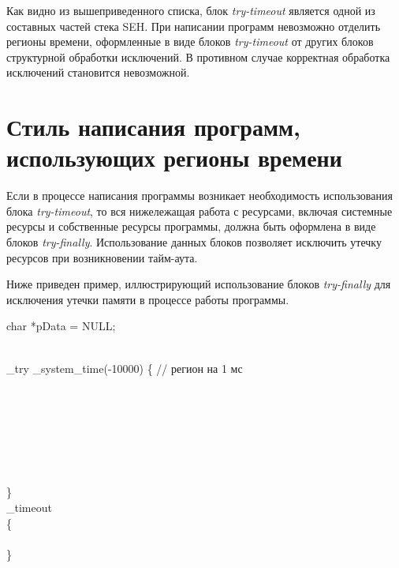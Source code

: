 \begin{multicols}{2}
   Как видно из вышеприведенного списка, блок \textit{try-timeout} является одной из составных частей
стека SEH. При написании программ невозможно отделить регионы времени, оформленные в виде
\mbox{блоков} \textit{try-timeout} от других блоков структурной обработки исключений. В противном случае
корректная обработка исключений становится невозможной.

\section{Стиль написания программ, использующих регионы времени}

   Если в процессе написания программы возникает необходимость использования блока
\textit{try-timeout}, то вся нижележащая работа с ресурсами, включая системные ресурсы и
собственные ресурсы программы, должна быть оформлена в виде блоков \textit{try-finally}.
Использование данных блоков позволяет исключить утечку ресурсов при возникновении
   тайм-аута.

   Ниже приведен пример, иллюстрирующий использование блоков \textit{try-finally} для исключения
утечки памяти в процессе работы программы.

\medskip
\noindent
{\sf char *pData = NULL;}\\
\

{\sf \_try \_system\_time(-10000) \{ // регион на 1 мс}\\
    \\
        \hspace*{5mm}{\sf pData = (char*)malloc(512); // выделение памяти}
        \hspace*{5mm}{\sf // работа с памятью}\\
        \hspace*{2.5mm}{\sf \}}\\
    \\
        \hspace*{5mm}{\sf if (pData)}\\
                \hspace*{7.5mm}{\sf free(pData); // освобождение памяти}\\
 \hspace*{2.5mm}{\sf   \}}\\
{\sf \} }            \\
{\sf \_timeout } \\
{\sf \{ }        \\
    \hspace*{2.5mm}{\sf printf(``Timeout!'');}\\
{\sf \}}\\


\end{multicols}
